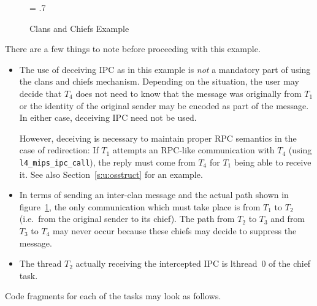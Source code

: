 \begin{figure}[htb]
\begin{center}
\leavevmode
\epsfxsize = .7\textwidth
{}
\end{center}
\caption{Clans and Chiefs Example}
\label{fig:clanex}
\end{figure}

There are a few things to note before proceeding with this example.

\begin{itemize}

\item The use of deceiving IPC as in this example is \emph{not} a
  mandatory part of using the clans and chiefs mechanism. Depending on
  the situation, the user may decide that $T_4$ does not need to know
  that the message was originally from $T_1$ or the identity of the
  original sender may be encoded as part of the message. In either
  case, deceiving IPC need not be used.

  However, deceiving is necessary to maintain proper RPC semantics in
  the case of redirection: If \(T_1\) attempts an RPC-like
  communication with \(T_4\) (using {\footnotesize\verb+l4_mips_ipc_call+}), the
  reply must come from \(T_4\) for \(T_1\) being able to receive it.
  See also Section~\ref{s:u:osstruct} for an example.

\item In terms of sending an inter-clan message and the actual path
  shown in figure~\ref{fig:clanex}, the only communication which must
  take place is from $T_1$ to $T_2$ (i.e.\ from the original sender to
  its chief). The path from $T_2$ to $T_3$ and from $T_3$ to $T_4$ may
  never occur because these chiefs may decide to suppress the message.

\item The thread \(T_2\) actually receiving the intercepted IPC is
  lthread~0 of the chief task.

\end{itemize}

Code fragments for each of the tasks may look as follows.


